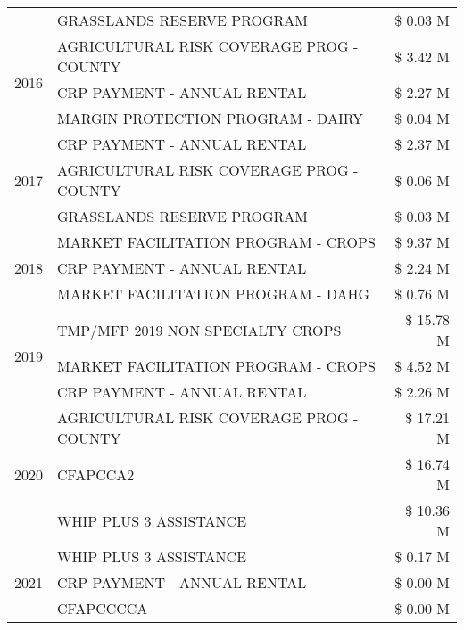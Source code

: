 \begin{tabular}{llr}
 & GRASSLANDS RESERVE PROGRAM & \$ 0.03 M \\
\cline{1-3}
\multirow[t]{3}{*}{2016} & AGRICULTURAL RISK COVERAGE PROG - COUNTY & \$ 3.42 M \\
 & CRP PAYMENT - ANNUAL RENTAL & \$ 2.27 M \\
 & MARGIN PROTECTION PROGRAM - DAIRY & \$ 0.04 M \\
\cline{1-3}
\multirow[t]{3}{*}{2017} & CRP PAYMENT - ANNUAL RENTAL & \$ 2.37 M \\
 & AGRICULTURAL RISK COVERAGE PROG - COUNTY & \$ 0.06 M \\
 & GRASSLANDS RESERVE PROGRAM & \$ 0.03 M \\
\cline{1-3}
\multirow[t]{3}{*}{2018} & MARKET FACILITATION PROGRAM - CROPS & \$ 9.37 M \\
 & CRP PAYMENT - ANNUAL RENTAL & \$ 2.24 M \\
 & MARKET FACILITATION PROGRAM - DAHG & \$ 0.76 M \\
\cline{1-3}
\multirow[t]{3}{*}{2019} & TMP/MFP 2019 NON SPECIALTY CROPS & \$ 15.78 M \\
 & MARKET FACILITATION PROGRAM - CROPS & \$ 4.52 M \\
 & CRP PAYMENT - ANNUAL RENTAL & \$ 2.26 M \\
\cline{1-3}
\multirow[t]{3}{*}{2020} & AGRICULTURAL RISK COVERAGE PROG - COUNTY & \$ 17.21 M \\
 & CFAPCCA2 & \$ 16.74 M \\
 & WHIP PLUS 3 ASSISTANCE & \$ 10.36 M \\
\cline{1-3}
\multirow[t]{3}{*}{2021} & WHIP PLUS 3 ASSISTANCE & \$ 0.17 M \\
 & CRP PAYMENT - ANNUAL RENTAL & \$ 0.00 M \\
 & CFAPCCCCA & \$ 0.00 M \\
\cline{1-3}
\bottomrule
\end{tabular}
